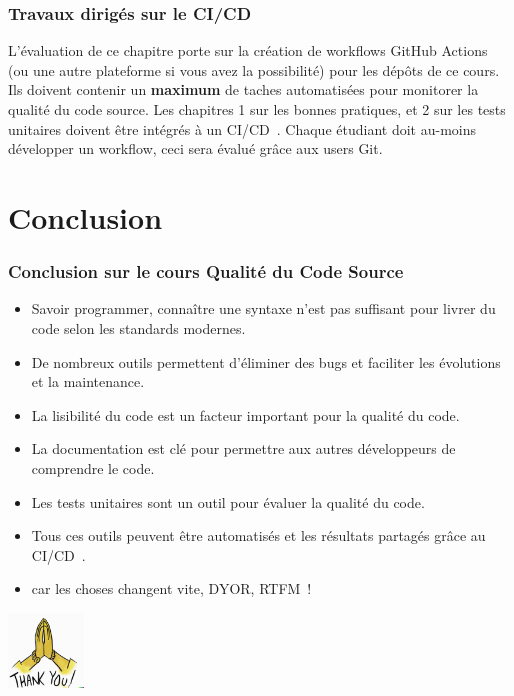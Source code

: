 \documentclass{beamer}
\begin{document}
    \begin{frame}
        \frametitle{Travaux dirigés sur le CI/CD}
        \transdissolve
        L'évaluation de ce chapitre porte sur la création de workflows GitHub Actions (ou une autre plateforme si vous avez la possibilité) pour les dépôts de ce cours.
        \bigbreak
        Ils doivent contenir un \textbf{maximum} de taches automatisées pour monitorer la qualité du code source.
        \bigbreak
        Les chapitres 1 sur les bonnes pratiques, et 2 sur les tests unitaires doivent être intégrés à un CI/CD~.
        \bigbreak
        Chaque étudiant doit au-moins développer un workflow, ceci sera évalué grâce aux users Git.
    \end{frame}


    \section{Conclusion}
    \begin{frame}
        \frametitle{Conclusion sur le cours Qualité du Code Source}
        \transdissolve
        \begin{itemize}
            \item Savoir programmer, connaître une syntaxe n'est pas suffisant pour livrer du code selon les standards modernes.
            \item De nombreux outils permettent d'éliminer des bugs et faciliter les évolutions et la maintenance.
            \item La lisibilité du code est un facteur important pour la qualité du code.
            \item La documentation est clé pour permettre aux autres développeurs de comprendre le code.
            \item Les tests unitaires sont un outil pour évaluer la qualité du code.
            \item Tous ces outils peuvent être automatisés et les résultats partagés grâce au CI/CD~.
            \item {} car les choses changent vite, DYOR, RTFM~!
        \end{itemize}
        \centering
        \includegraphics[width=2cm]{image/prayer-hands-thank-you.png}
    \end{frame}
\end{document}
